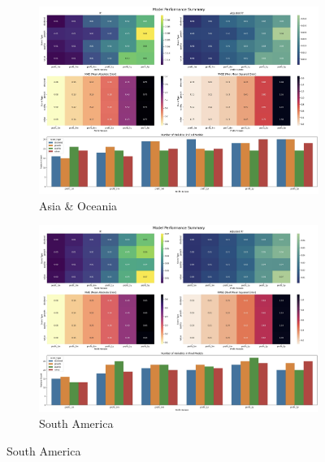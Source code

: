 \documentclass[11pt,english,a4paper,hidelinks]{book}
\begin{document}
\begin{figure}[H]
    \vspace{0.5cm}
    \hfill
    \begin{subfigure}[b]{0.48\textwidth}
        \centering
        \includegraphics[width=\textwidth]{images/code/models/linear_regression/first_model/AS - performance.png}
        \caption{Asia \& Oceania}
    \end{subfigure}
    \hfill
    \begin{subfigure}[b]{0.48\textwidth}
        \centering
        \includegraphics[width=\textwidth]{images/code/models/linear_regression/first_model/LAT - performance.png}
        \caption{South America}
    \end{subfigure}


\end{figure}
\end{document}
